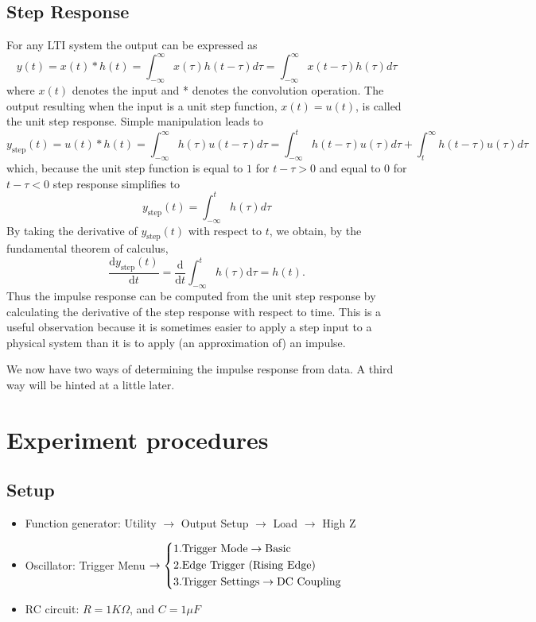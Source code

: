 \documentclass[a4paper]{article}
\begin{document}
\subsection{Step Response}
For any LTI system the output can be expressed as
\begin{equation}
	y(t)=x(t)*h(t)=\int_{-\infty}^\infty x(\tau)h(t-\tau)d\tau=\int_{-\infty}^\infty x(t-\tau)h(\tau)d\tau
\end{equation}
where $x(t)$ denotes the input and * denotes the convolution operation. The output resulting when the input is a unit step function, $x(t)=u(t)$, is called the unit step response. Simple manipulation leads to
\begin{equation}
	y_\text{step}(t)=u(t)*h(t)=\int_{-\infty}^\infty h(\tau)u(t-\tau)d\tau=\int_{-\infty}^th(t-\tau)u(\tau)d\tau+\int_t^\infty h(t-\tau)u(\tau)d\tau
\end{equation}
which, because the unit step function is equal to $1$ for $t-\tau>0$ and equal to $0$ for $t-\tau<0$ step response simplifies to
\begin{equation}
	y_\text{step}(t)=\int_{-\infty}^th(\tau)d\tau
\end{equation}
By taking the derivative of $y_\text{step}(t)$ with respect to $t$, we obtain, by the fundamental theorem of calculus,
\begin{equation}
	\frac{\mathrm{d}y_\text{step}(t)}{\mathrm{d}t}=\frac{\mathrm{d}}{\mathrm{d}t}\int_{-\infty}^th(\tau)\mathrm{d}\tau=h(t).
\end{equation}
Thus the impulse response can be computed from the unit step response by calculating the derivative of the step response with respect to time. This is a useful observation because it is sometimes easier to apply a step input to a physical system than it is to apply (an approximation of) an impulse.

We now have two ways of determining the impulse response from data. A third way will be hinted at a little later.
\section{Experiment procedures}
\subsection*{Setup}
\begin{itemize}
	\item Function generator: Utility $\rightarrow$ Output Setup $\rightarrow$ Load $\rightarrow$ High Z
	\item Oscillator: Trigger Menu 
	$\rightarrow\left\{
	\begin{aligned}
		&\rm{1.Trigger\ Mode\rightarrow Basic}\\
		&\rm{2.Edge\ Trigger\ (Rising\ Edge)}\\
		&\rm{3.Trigger\ Settings\rightarrow DC\ Coupling}
	\end{aligned}
	\right.$
	\item RC circuit: $R=1K\Omega$, and $C=1\mu F$
\end{itemize}
\end{document}
